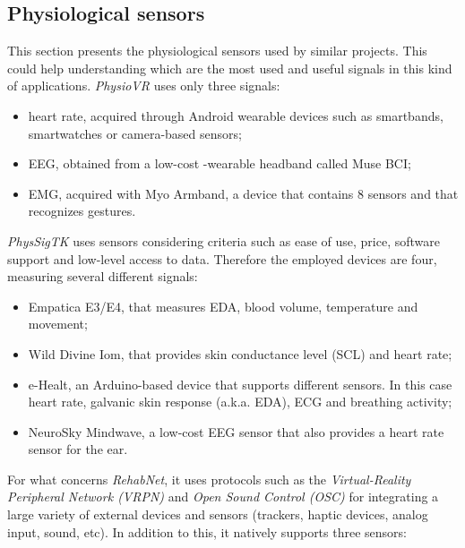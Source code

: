 \documentclass[binding=0.6cm,LaM]{sapthesis}
\begin{document}
\subsection{Physiological sensors}
This section presents the physiological sensors used by similar projects. This could help understanding which are the most used and useful signals in this kind of applications.
\textit{PhysioVR} uses only three signals: 

\begin{itemize}

\item heart rate, acquired through Android wearable devices such as smartbands, smartwatches or camera-based sensors;

\item EEG, obtained from a low-cost -wearable headband called Muse BCI;

\item EMG, acquired with Myo Armband, a device that contains 8 sensors and that recognizes gestures.

\end{itemize}
\textit{PhysSigTK} uses sensors considering criteria such as ease of use, price, software support and low-level access to data. Therefore the employed devices are four, measuring several different signals:  

\begin{itemize}

\item Empatica E3/E4, that measures EDA, blood volume, temperature and movement;

\item Wild Divine Iom, that provides skin conductance level (SCL) and heart rate;

\item e-Healt, an Arduino-based device that supports different sensors. In this case heart rate, galvanic skin response (a.k.a. EDA), ECG and breathing activity;  

\item NeuroSky Mindwave, a low-cost EEG sensor that also provides a heart rate sensor for the ear.

\end{itemize}
For what concerns \textit{RehabNet}, it uses protocols such as the \textit{Virtual-Reality Peripheral Network (VRPN)} and \textit{Open Sound Control (OSC)} for integrating a large variety of external devices and sensors (trackers, haptic devices, analog input, sound, etc). In addition to this, it natively supports three sensors:
\end{document}
